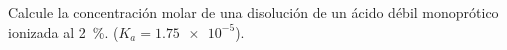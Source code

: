 Calcule la concentración molar de una disolución de un ácido débil monoprótico ionizada al \SI{2}{\percent}. ($K_a = \num{1,75e-5}$).
